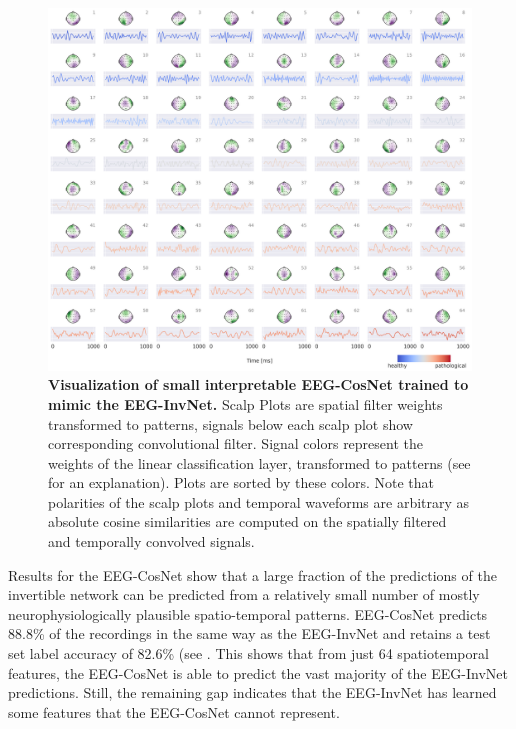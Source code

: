 \begin{figure}[htb]
    \myfloatalign
    \includegraphics[width=1\linewidth]{images/cos-sim-net-pattern-with-hspace.png}
    \caption[Visualization of EEG-CosNet on pathology decoding]{
\textbf{Visualization of small interpretable EEG-CosNet trained to mimic
the EEG-InvNet.} Scalp Plots are spatial filter weights transformed to
patterns, signals below each scalp plot show corresponding convolutional
filter. Signal colors represent the weights of the linear classification
layer, transformed to patterns (see 
for an explanation). Plots are sorted by these colors. Note that
polarities of the scalp plots and temporal waveforms are arbitrary as
absolute cosine similarities are computed on the spatially filtered and
temporally convolved signals.
}
\label{cos-pattern}
\end{figure}

    Results for the EEG-CosNet show that a large fraction of the predictions
of the invertible network can be predicted from a relatively small
number of mostly neurophysiologically plausible spatio-temporal
patterns. EEG-CosNet predicts 88.8\% of the recordings in the same way
as the EEG-InvNet and retains a test set label accuracy of 82.6\% (see
. This shows that from just
64 spatiotemporal features, the EEG-CosNet is able to predict the vast
majority of the EEG-InvNet predictions. Still, the remaining gap
indicates that the EEG-InvNet has learned some features that the
EEG-CosNet cannot represent.

